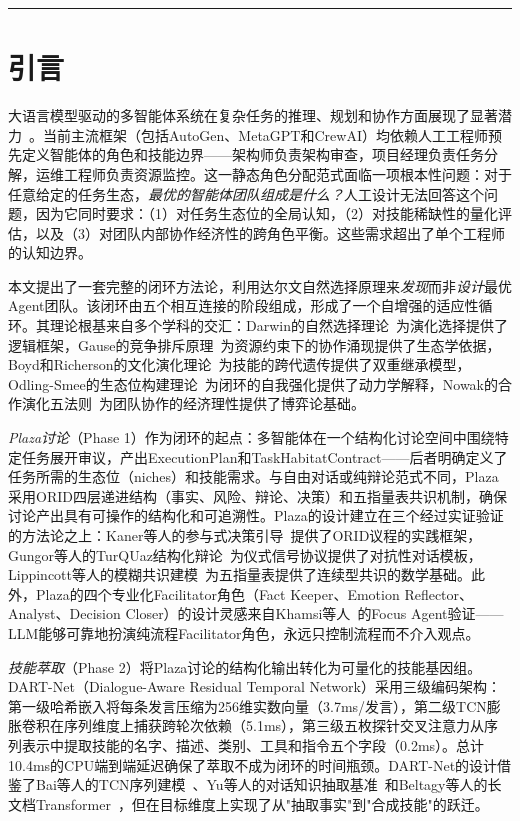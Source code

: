 \documentclass[12pt,a4paper]{ctexart}
\begin{document}
\vspace{12pt}
\hrule
\vspace{12pt}

\section{引言}

大语言模型驱动的多智能体系统在复杂任务的推理、规划和协作方面展现了显著潜力~\cite{wu2023autogen,park2023generative,hong2023metagpt,shinn2023reflexion}。当前主流框架（包括AutoGen、MetaGPT和CrewAI）均依赖人工工程师预先定义智能体的角色和技能边界——架构师负责架构审查，项目经理负责任务分解，运维工程师负责资源监控。这一静态角色分配范式面临一项根本性问题：对于任意给定的任务生态，\emph{最优的智能体团队组成是什么？}人工设计无法回答这个问题，因为它同时要求：（1）对任务生态位的全局认知，（2）对技能稀缺性的量化评估，以及（3）对团队内部协作经济性的跨角色平衡。这些需求超出了单个工程师的认知边界。

本文提出了一套完整的闭环方法论，利用达尔文自然选择原理来\emph{发现}而非\emph{设计}最优Agent团队。该闭环由五个相互连接的阶段组成，形成了一个自增强的适应性循环。其理论根基来自多个学科的交汇：Darwin的自然选择理论~\cite{darwin1859}为演化选择提供了逻辑框架，Gause的竞争排斥原理~\cite{gause1934struggle}为资源约束下的协作涌现提供了生态学依据，Boyd和Richerson的文化演化理论~\cite{boyd1985culture}为技能的跨代遗传提供了双重继承模型，Odling-Smee的生态位构建理论~\cite{odling2003niche}为闭环的自我强化提供了动力学解释，Nowak的合作演化五法则~\cite{nowak2006five}为团队协作的经济理性提供了博弈论基础。

\emph{Plaza讨论}（Phase 1）作为闭环的起点：多智能体在一个结构化讨论空间中围绕特定任务展开审议，产出ExecutionPlan和TaskHabitatContract——后者明确定义了任务所需的生态位（niches）和技能需求。与自由对话或纯辩论范式不同，Plaza采用ORID四层递进结构（事实、风险、辩论、决策）和五指量表共识机制，确保讨论产出具有可操作的结构化和可追溯性。Plaza的设计建立在三个经过实证验证的方法论之上：Kaner等人的参与式决策引导~\cite{kaner2014facilitator}提供了ORID议程的实践框架，Gungor等人的TurQUaz结构化辩论~\cite{gungor2025turquaz}为仪式信号协议提供了对抗性对话模板，Lippincott等人的模糊共识建模~\cite{lippincott2025fuzzy}为五指量表提供了连续型共识的数学基础。此外，Plaza的四个专业化Facilitator角色（Fact Keeper、Emotion Reflector、Analyst、Decision Closer）的设计灵感来自Khamsi等人~\cite{khamsi2024focus}的Focus Agent验证——LLM能够可靠地扮演纯流程Facilitator角色，永远只控制流程而不介入观点。

\emph{技能萃取}（Phase 2）将Plaza讨论的结构化输出转化为可量化的技能基因组。DART-Net（Dialogue-Aware Residual Temporal Network）采用三级编码架构：第一级哈希嵌入将每条发言压缩为256维实数向量（3.7ms/发言），第二级TCN膨胀卷积在序列维度上捕获跨轮次依赖（5.1ms），第三级五枚探针交叉注意力从序列表示中提取技能的名字、描述、类别、工具和指令五个字段（0.2ms）。总计10.4ms的CPU端到端延迟确保了萃取不成为闭环的时间瓶颈。DART-Net的设计借鉴了Bai等人的TCN序列建模~\cite{bai2018tcn}、Yu等人的对话知识抽取基准~\cite{yu2022d2k}和Beltagy等人的长文档Transformer~\cite{beltagy2020longformer}，但在目标维度上实现了从"抽取事实"到"合成技能"的跃迁。
\end{document}
